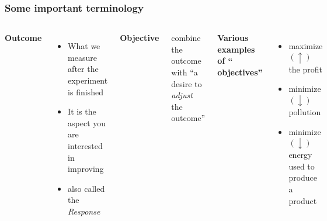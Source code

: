 \documentclass[11pt,aspectratio=169,mathserif]{beamer}
\begin{document}
\begin{frame}\frametitle{Some important terminology}
	\begin{columns}[T]
			\textbf{{\color{purple} Outcome}}
				\begin{itemize}
					\item	What we measure after the experiment is finished  
					\item	It is the aspect you are interested in improving  
					\item	also called the \emph{Response}

				\end{itemize}
			
			\pause
			\vspace{12pt}	
			\textbf{{\color{purple} Objective}}
			
				\vspace{1pt}	
				\qquad combine the {\color{purple} outcome} with ``a desire to \emph{adjust} the outcome''
				
				
			\pause
			\vspace{12pt}
			
			{\textbf{{Various examples of ``{\color{purple} objectives}''}}}

				\begin{itemize}
					\item	maximize $(\uparrow)$ the profit
					\item	minimize $(\downarrow)$ pollution
					\item	minimize $(\downarrow)$ energy used to produce a product
				\end{itemize}
			
			
	\end{columns}
\end{frame}
\end{document}

